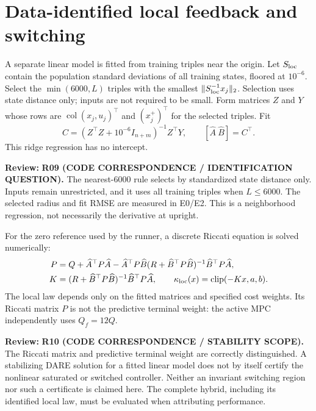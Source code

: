 \documentclass[11pt]{article}
\newcommand{\col}{\operatorname{col}}
\newcommand{\clip}{\operatorname{clip}}
\newcommand{\review}[1]{\par\noindent\textcolor{red!70!black}{\textbf{Review:} #1}\par}
\begin{document}
\section{Data-identified local feedback and switching}
A separate linear model is fitted from training triples near the origin. Let $S_{\rm loc}$ contain the population standard deviations of all training states, floored at $10^{-6}$. Select the $\min(6000,L)$ triples with the smallest $\|S_{\rm loc}^{-1}x_j\|_2$. Selection uses state distance only; inputs are not required to be small. Form matrices $Z$ and $Y$ whose rows are $\col(x_j,u_j)^\top$ and $(x_j^+)^\top$ for the selected triples. Fit
\begin{equation}\label{eq:ridge}
C=(Z^\top Z+10^{-6}I_{n+m})^{-1}Z^\top Y,\qquad [\widehat A\ \widehat B]=C^\top.
\end{equation}
This ridge regression has no intercept.
\review{\textbf{R09 (CODE CORRESPONDENCE / IDENTIFICATION QUESTION).} The nearest-6000 rule selects by standardized state distance only. Inputs remain unrestricted, and it uses all training triples when $L\leq6000$. The selected radius and fit RMSE are measured in E0/E2. This is a neighborhood regression, not necessarily the derivative at upright.}
 For the zero reference used by the runner, a discrete Riccati equation is solved numerically:
\begin{align}
P&=Q+\widehat A^\top P\widehat A-\widehat A^\top P\widehat B(R+\widehat B^\top P\widehat B)^{-1}\widehat B^\top P\widehat A,\label{eq:dare}\\
K&=(R+\widehat B^\top P\widehat B)^{-1}\widehat B^\top P\widehat A,\qquad
\kappa_{\rm loc}(x)=\clip(-Kx,a,b).\label{eq:local}
\end{align}
The local law depends only on the fitted matrices and specified cost weights. Its Riccati matrix $P$ is not the predictive terminal weight: the active MPC independently uses $Q_f=12Q$.
\review{\textbf{R10 (CODE CORRESPONDENCE / STABILITY SCOPE).} The Riccati matrix and predictive terminal weight are correctly distinguished. A stabilizing DARE solution for a fitted linear model does not by itself certify the nonlinear saturated or switched controller. Neither an invariant switching region nor such a certificate is claimed here. The complete hybrid, including its identified local law, must be evaluated when attributing performance.}
\end{document}
